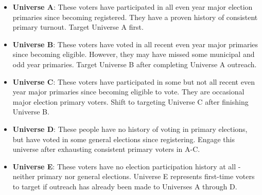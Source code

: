 \documentclass{article}
\begin{document}
\begin{itemize}

\item \textbf{Universe A}: These voters have participated in all even year major election primaries since becoming registered. They have a proven history of consistent primary turnout. Target Universe A first.

\item \textbf{Universe B}: These voters have voted in all recent even year major primaries since becoming eligible. However, they may have missed some municipal and odd year primaries. Target Universe B after completing Universe A outreach.

\item \textbf{Universe C}: These voters have participated in some but not all recent even year major primaries since becoming eligible to vote. They are occasional major election primary voters. Shift to targeting Universe C after finishing Universe B.

\item \textbf{Universe D}: These people have no history of voting in primary elections, but have voted in some general elections since registering. Engage this universe after exhausting consistent primary voters in A-C.

\item \textbf{Universe E}: These voters have no election participation history at all - neither primary nor general elections. Universe E represents first-time voters to target if outreach has already been made to Universes A through D.

\end{itemize}
\end{document}
